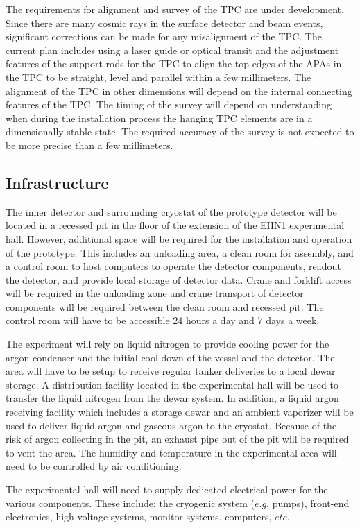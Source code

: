 The requirements for alignment and survey of the TPC are under development. Since there are many cosmic rays in the surface detector and beam events, significant corrections can be made for any misalignment of the TPC. The current plan includes using a laser guide or optical transit and the adjustment features of the support rods for the TPC to align the top edges of the APAs in the TPC to be straight, level and parallel within a few millimeters. The alignment of the TPC in other dimensions will depend on the internal connecting features of the TPC.  The timing of the survey will depend on understanding when during the installation process the hanging TPC elements are in a dimensionally stable state. The required accuracy of the survey is not expected to be more precise than a few millimeters.  


\subsection{Infrastructure}

The inner detector and surrounding cryostat of the prototype detector will be located in a recessed pit in the floor of the extension of the EHN1 experimental hall.  However, additional space will be required for the installation and operation of the prototype.  This includes an unloading area, a clean room for assembly, and a control room to host computers to operate the detector components, readout the detector, and provide local storage of detector data.  Crane and forklift access will be required in the unloading zone and crane transport of detector components will be required between the clean room and recessed pit.  The control room will have to be accessible 24 hours a day and 7 days a week.

The experiment will rely on liquid nitrogen to provide cooling power for the argon condenser and the initial cool down of the vessel and the detector.  The area will have to be setup to receive regular tanker deliveries to a local dewar storage.  A distribution facility located in the experimental hall will be used to transfer the liquid nitrogen from the dewar system.  In addition, a liquid argon receiving facility which includes a storage dewar and an ambient vaporizer will be used to deliver liquid argon and gaseous argon to the cryostat.  Because of the risk of argon collecting in the pit, an exhaust pipe out of the pit will be required to vent the area.  The humidity and temperature in the experimental area will need to be controlled by air conditioning.   

The experimental hall will need to supply dedicated electrical power for the various components. These include:
the cryogenic system ($e.g.$ pumps), front-end electronics, high voltage systems, monitor systems, computers, $etc.$


